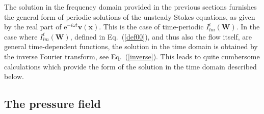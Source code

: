 \documentclass[aps,prx,twocolumn,amsmath,amssymb,amsfonts]{revtex4-2}
\newcommand{\re}{\mathrm{e}}            %
\begin{document}
The solution in the frequency domain provided in the previous sections furnishes the general form of periodic solutions of the unsteady Stokes equations, as given by the real part of $\re^{-i\omega t}\bm v(\bm x)$. This is the case of time-periodic $I^{t}_{lm}(\bm W)$. In the case where $I^{t}_{lm}(\bm W)$, defined in Eq.~(\ref{def00}), and thus also the flow itself, are general time-dependent functions, the solution in the time domain is obtained by the inverse Fourier transform, see Eq.~(\ref{inverse}). This leads to quite cumbersome calculations which provide the form of the solution in the time domain described below.

\subsection{The pressure field}
\end{document}
